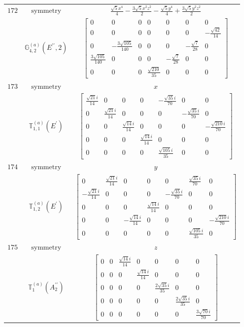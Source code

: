 \documentclass[fleqn,8pt,landscape]{jsarticle}
\begin{document}
\begin{longtable}{ccc}
$ 172 $ & $ \text{symmetry} $ & $ \frac{\sqrt{5} x^{4}}{4} - \frac{3 \sqrt{5} x^{2} z^{2}}{2} - \frac{\sqrt{5} y^{4}}{4} + \frac{3 \sqrt{5} y^{2} z^{2}}{2} $ \\
$  $ & $ \mathbb{G}_{4,2}^{(a)}(E^{\prime\prime},2) $ & $ \begin{bmatrix} 0 & 0 & 0 & 0 & 0 & 0 & 0 \\ 0 & 0 & 0 & 0 & 0 & 0 & - \frac{\sqrt{42}}{14} \\ 0 & - \frac{3 \sqrt{105}}{140} & 0 & 0 & 0 & - \frac{\sqrt{7}}{28} & 0 \\ \frac{3 \sqrt{105}}{140} & 0 & 0 & 0 & - \frac{\sqrt{7}}{28} & 0 & 0 \\ 0 & 0 & 0 & \frac{\sqrt{210}}{35} & 0 & 0 & 0 \end{bmatrix} $ \\ \hline
$ 173 $ & $ \text{symmetry} $ & $ x $ \\
$  $ & $ \mathbb{T}_{1,1}^{(a)}(E^{\prime}) $ & $ \begin{bmatrix} \frac{\sqrt{21} i}{14} & 0 & 0 & 0 & - \frac{\sqrt{35} i}{70} & 0 & 0 \\ 0 & \frac{\sqrt{21} i}{14} & 0 & 0 & 0 & - \frac{\sqrt{35} i}{70} & 0 \\ 0 & 0 & \frac{\sqrt{14} i}{14} & 0 & 0 & 0 & - \frac{\sqrt{210} i}{70} \\ 0 & 0 & 0 & \frac{\sqrt{14} i}{14} & 0 & 0 & 0 \\ 0 & 0 & 0 & 0 & \frac{\sqrt{105} i}{35} & 0 & 0 \end{bmatrix} $ \\ \hline
$ 174 $ & $ \text{symmetry} $ & $ y $ \\
$  $ & $ \mathbb{T}_{1,2}^{(a)}(E^{\prime}) $ & $ \begin{bmatrix} 0 & \frac{\sqrt{21} i}{14} & 0 & 0 & 0 & \frac{\sqrt{35} i}{70} & 0 \\ - \frac{\sqrt{21} i}{14} & 0 & 0 & 0 & - \frac{\sqrt{35} i}{70} & 0 & 0 \\ 0 & 0 & 0 & \frac{\sqrt{14} i}{14} & 0 & 0 & 0 \\ 0 & 0 & - \frac{\sqrt{14} i}{14} & 0 & 0 & 0 & - \frac{\sqrt{210} i}{70} \\ 0 & 0 & 0 & 0 & 0 & \frac{\sqrt{105} i}{35} & 0 \end{bmatrix} $ \\ \hline
$ 175 $ & $ \text{symmetry} $ & $ z $ \\
$  $ & $ \mathbb{T}_{1}^{(a)}(A_{2}^{\prime\prime}) $ & $ \begin{bmatrix} 0 & 0 & \frac{\sqrt{14} i}{14} & 0 & 0 & 0 & 0 \\ 0 & 0 & 0 & \frac{\sqrt{14} i}{14} & 0 & 0 & 0 \\ 0 & 0 & 0 & 0 & \frac{2 \sqrt{35} i}{35} & 0 & 0 \\ 0 & 0 & 0 & 0 & 0 & \frac{2 \sqrt{35} i}{35} & 0 \\ 0 & 0 & 0 & 0 & 0 & 0 & \frac{3 \sqrt{70} i}{70} \end{bmatrix} $ \\ \hline

\end{longtable}
\end{document}
